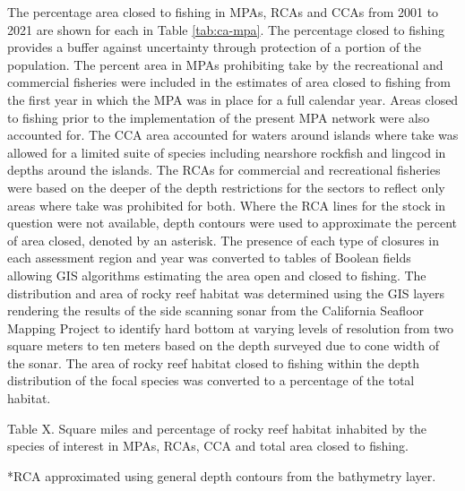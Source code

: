 \documentclass[11pt,
  english,
  a4paper,
]{article}
\begin{document}

The percentage area closed to fishing in MPAs, RCAs and CCAs from 2001 to 2021 are shown for each in Table \ref{tab:ca-mpa}. The percentage closed to fishing provides a buffer against uncertainty through protection of a portion of the population. The percent area in MPAs prohibiting take by the recreational and commercial fisheries were included in the estimates of area closed to fishing from the first year in which the MPA was in place for a full calendar year. Areas closed to fishing prior to the implementation of the present MPA network were also accounted for. The CCA area accounted for waters around islands where take was allowed for a limited suite of species including nearshore rockfish and lingcod in depths around the islands. The RCAs for commercial and recreational fisheries were based on the deeper of the depth restrictions for the sectors to reflect only areas where take was prohibited for both. Where the RCA lines for the stock in question were not available, depth contours were used to approximate the percent of area closed, denoted by an asterisk. The presence of each type of closures in each assessment region and year was converted to tables of Boolean fields allowing GIS algorithms estimating the area open and closed to fishing. The distribution and area of rocky reef habitat was determined using the GIS layers rendering the results of the side scanning sonar from the California Seafloor Mapping Project to identify hard bottom at varying levels of resolution from two square meters to ten meters based on the depth surveyed due to cone width of the sonar. The area of rocky reef habitat closed to fishing within the depth distribution of the focal species was converted to a percentage of the total habitat.

\leavevmode\tagmcend\tagstructend\par


Table X. Square miles and percentage of rocky reef habitat inhabited by the species of interest in MPAs, RCAs, CCA and total area closed to fishing.

\leavevmode\tagmcend\tagstructend\par


*RCA approximated using general depth contours from the bathymetry layer.

\leavevmode\tagmcend\tagstructend\par
\end{document}
